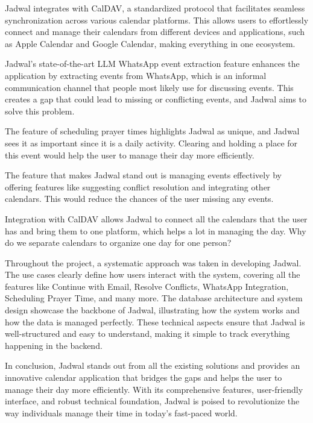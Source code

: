 \documentclass[12pt,a4paper,twoside]{report}
\begin{document}
Jadwal integrates with CalDAV, a standardized protocol that facilitates seamless synchronization across various calendar platforms. This allows users to effortlessly connect and manage their calendars from different devices and applications, such as Apple Calendar and Google Calendar, making everything in one ecosystem.

Jadwal's state-of-the-art LLM WhatsApp event extraction feature enhances the application by extracting events from WhatsApp, which is an informal communication channel that people most likely use for discussing events. This creates a gap that could lead to missing or conflicting events, and Jadwal aims to solve this problem.

The feature of scheduling prayer times highlights Jadwal as unique, and Jadwal sees it as important since it is a daily activity. Clearing and holding a place for this event would help the user to manage their day more efficiently.

The feature that makes Jadwal stand out is managing events effectively by offering features like suggesting conflict resolution and integrating other calendars. This would reduce the chances of the user missing any events.

Integration with CalDAV allows Jadwal to connect all the calendars that the user has and bring them to one platform, which helps a lot in managing the day. Why do we separate calendars to organize one day for one person?

Throughout the project, a systematic approach was taken in developing Jadwal. The use cases clearly define how users interact with the system, covering all the features like Continue with Email, Resolve Conflicts, WhatsApp Integration, Scheduling Prayer Time, and many more. The database architecture and system design showcase the backbone of Jadwal, illustrating how the system works and how the data is managed perfectly. These technical aspects ensure that Jadwal is well-structured and easy to understand, making it simple to track everything happening in the backend.

In conclusion, Jadwal stands out from all the existing solutions and provides an innovative calendar application that bridges the gaps and helps the user to manage their day more efficiently. With its comprehensive features, user-friendly interface, and robust technical foundation, Jadwal is poised to revolutionize the way individuals manage their time in today's fast-paced world.




\end{document}
